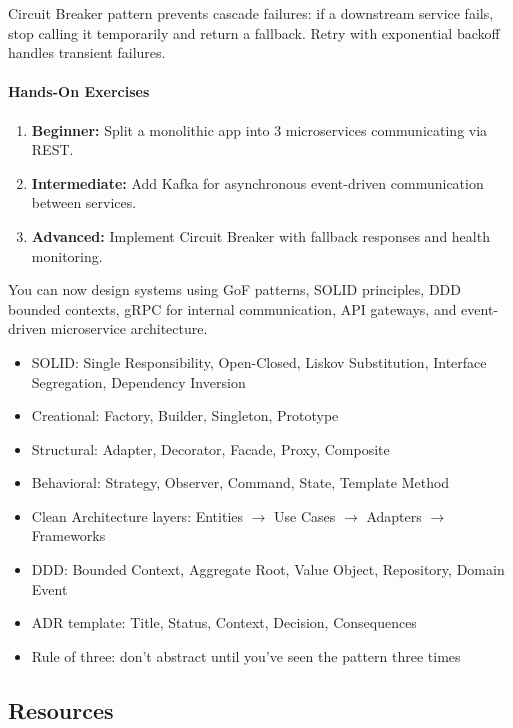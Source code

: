 \documentclass[11pt, a4paper, oneside]{report}
\begin{document}
Circuit Breaker pattern prevents cascade failures: if a downstream service fails, stop calling it temporarily and return a fallback. Retry with exponential backoff handles transient failures.

\paragraph{Hands-On Exercises}
\begin{enumerate}[leftmargin=*]
\item \textbf{Beginner:} Split a monolithic app into 3 microservices communicating via REST.
\item \textbf{Intermediate:} Add Kafka for asynchronous event-driven communication between services.
\item \textbf{Advanced:} Implement Circuit Breaker with fallback responses and health monitoring.
\end{enumerate}

\begin{microcheckpoint}
You can now design systems using GoF patterns, SOLID principles, DDD bounded contexts, gRPC for internal communication, API gateways, and event-driven microservice architecture.
\end{microcheckpoint}

\begin{cheatsheetbox}
\begin{itemize}[leftmargin=*]
\item SOLID: Single Responsibility, Open-Closed, Liskov Substitution, Interface Segregation, Dependency Inversion
\item Creational: Factory, Builder, Singleton, Prototype
\item Structural: Adapter, Decorator, Facade, Proxy, Composite
\item Behavioral: Strategy, Observer, Command, State, Template Method
\item Clean Architecture layers: Entities $\to$ Use Cases $\to$ Adapters $\to$ Frameworks
\item DDD: Bounded Context, Aggregate Root, Value Object, Repository, Domain Event
\item ADR template: Title, Status, Context, Decision, Consequences
\item Rule of three: don't abstract until you've seen the pattern three times
\end{itemize}
\end{cheatsheetbox}

\subsection*{Resources}
\end{document}

